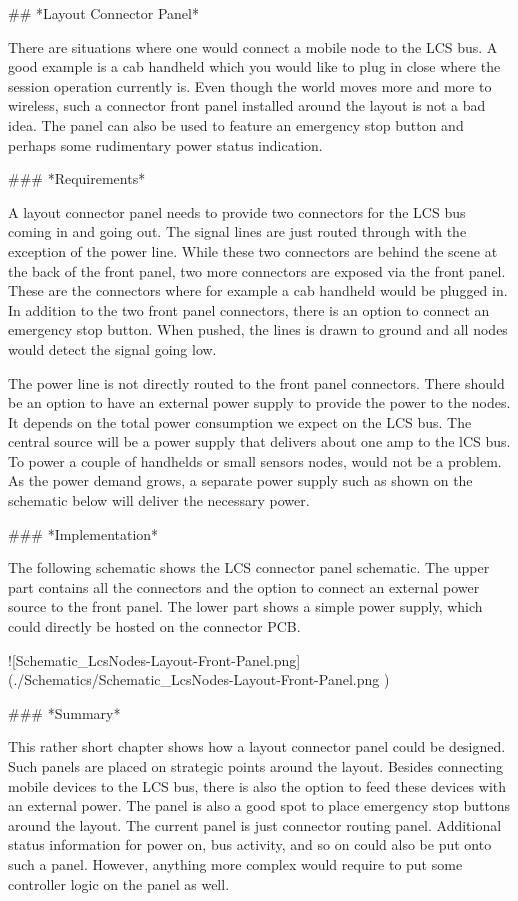 ## *Layout Connector Panel*

There are situations where one would connect a mobile node to the LCS bus. A good example is a cab handheld which you would like to plug in close where the session operation currently is. Even though the world moves more and more to wireless, such a connector front panel installed around the layout is not a bad idea. The panel can also be used to feature an emergency stop button and perhaps some rudimentary power status indication.

### *Requirements*

A layout connector panel needs to provide two connectors for the LCS bus coming in and going out. The signal lines are just routed through with the exception of the power line. While these two connectors are behind the scene at the back of the front panel, two more connectors are exposed via the front panel. These are the connectors where for example a cab handheld would be plugged in. In addition to the two front panel connectors, there is an option to connect an emergency stop button. When pushed, the lines is drawn to ground and all nodes would detect the signal going low.

The power line is not directly routed to the front panel connectors. There should be an option to have an external power supply to provide the power to the nodes. It depends on the total power consumption we expect on the LCS bus. The central source will be a power supply that delivers about one amp to the lCS bus. To power a couple of handhelds or small sensors nodes, would not be a problem. As the power demand grows, a separate power supply such as shown on the schematic below will deliver the necessary power.

### *Implementation*

The following schematic shows the LCS connector panel schematic. The upper part contains all the connectors and the option to connect an external power source to the front panel. The lower part shows a simple power supply, which could directly be hosted on the connector PCB.

![Schematic_LcsNodes-Layout-Front-Panel.png](./Schematics/Schematic_LcsNodes-Layout-Front-Panel.png )

### *Summary*

This rather short chapter shows how a layout connector panel could be designed. Such panels are placed on strategic points around the layout. Besides connecting mobile devices to the LCS bus, there is also the option to feed these devices with an external power.  The panel is also a good spot to place emergency stop buttons around the layout.  The current panel is just connector routing panel.  Additional status information for power on, bus activity, and so on could also be put onto such a panel. However, anything more complex would require to put some controller logic on the panel as well.

